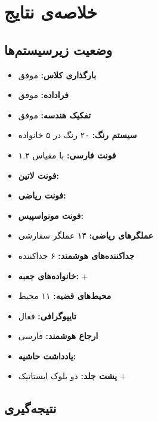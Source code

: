 \documentclass{matinbook}
\begin{document}
\chapter{خلاصه‌ی نتایج}
\label{chap:summary}

\section{وضعیت زیرسیستم‌ها}
\label{sec:summary-status}

\begin{itemize}
    \item \textcolor{matingreen}{\textbf{بارگذاری کلاس:}} موفق
    \item \textcolor{matingreen}{\textbf{فراداده:}} موفق
    \item \textcolor{matingreen}{\textbf{تفکیک هندسه:}} موفق
    \item \textcolor{matingreen}{\textbf{سیستم رنگ:}} ۲۰ رنگ  در ۵ خانواده
    \item \textcolor{matingreen}{\textbf{فونت فارسی:}}  با مقیاس ۱.۲
    \item \textcolor{matingreen}{\textbf{فونت لاتین:}} 
    \item \textcolor{matingreen}{\textbf{فونت ریاضی:}} 
    \item \textcolor{matingreen}{\textbf{فونت مونواسپیس:}} 
    \item \textcolor{matingreen}{\textbf{عملگرهای ریاضی:}} ۱۴ عملگر سفارشی
    \item \textcolor{matingreen}{\textbf{جداکننده‌های هوشمند:}} ۶ جداکننده
    \item \textcolor{matingreen}{\textbf{خانواده‌های جعبه:}}  + 
    \item \textcolor{matingreen}{\textbf{محیط‌های قضیه:}} ۱۱ محیط
    \item \textcolor{matingreen}{\textbf{تایپوگرافی:}}  فعال
    \item \textcolor{matingreen}{\textbf{ارجاع هوشمند:}}  فارسی
    \item \textcolor{matingreen}{\textbf{یادداشت حاشیه:}} 
    \item \textcolor{matingreen}{\textbf{پشت جلد:}} دو بلوک ایستاتیک + 
\end{itemize}

\section{نتیجه‌گیری}
\label{sec:summary-conclusion}
\end{document}
